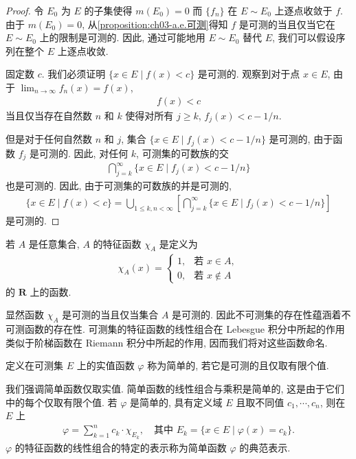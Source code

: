 \documentclass[../../main.tex]{subfiles}
\begin{document}
\begin{proof}
令 $E_{0}$ 为 $E$ 的子集使得 $m(E_{0})=0$ 而 $\{f_{n}\}$ 在 $E\sim E_{0}$ 上逐点收敛于 $f$. 由于 $m(E_{0})=0$, 从\cref{proposition:ch03-a.e.可测}得知 $f$ 是可测的当且仅当它在 $E\sim E_{0}$ 上的限制是可测的. 因此, 通过可能地用 $E\sim E_{0}$ 替代 $E$, 我们可以假设序列在整个 $E$ 上逐点收敛.

固定数 $c$. 我们必须证明 $\{x\in E\mid f(x)<c\}$ 是可测的. 观察到对于点 $x\in E$, 由于 $\lim_{n\to\infty}f_{n}(x)=f(x)$,
\begin{align*}
f(x)<c
\end{align*}
当且仅当存在自然数 $n$ 和 $k$ 使得对所有 $j\geqslant k$, $f_{j}(x)<c-1/n$.

但是对于任何自然数 $n$ 和 $j$, 集合 $\{x\in E\mid f_{j}(x)<c-1/n\}$ 是可测的, 由于函数 $f_{j}$ 是可测的. 因此, 对任何 $k$, 可测集的可数族的交
\begin{align*}
\bigcap_{j=k}^{\infty}\{x\in E\mid f_{j}(x)<c-1/n\}
\end{align*}
也是可测的. 因此, 由于可测集的可数族的并是可测的,
\begin{align*}
\{x\in E\mid f(x)<c\}=\bigcup_{1\leqslant k,n<\infty}\left[\bigcap_{j=k}^{\infty}\{x\in E\mid f_{j}(x)<c-1/n\}\right]
\end{align*}
是可测的.
\end{proof}

若 $A$ 是任意集合, $A$ 的特征函数 $\chi_{A}$ 是定义为
\begin{align*}
\chi_{A}(x)=
\begin{cases}
1,&\text{若 }x\in A,\\
0,&\text{若 }x\notin A
\end{cases}
\end{align*}
的 $\mathbf{R}$ 上的函数.

显然函数 $\chi_{A}$ 是可测的当且仅当集合 $A$ 是可测的. 因此不可测集的存在性蕴涵着不可测函数的存在性. 可测集的特征函数的线性组合在 Lebesgue 积分中所起的作用类似于阶梯函数在 Riemann 积分中所起的作用, 因而我们将对这些函数命名.

\begin{definition}[简单函数]\label{definition:ch03-简单函数}
定义在可测集 $E$ 上的实值函数 $\varphi$ 称为简单的, 若它是可测的且仅取有限个值.
\end{definition}

我们强调简单函数仅取实值. 简单函数的线性组合与乘积是简单的, 这是由于它们中的每个仅取有限个值. 若 $\varphi$ 是简单的, 具有定义域 $E$ 且取不同值 $c_{1},\cdots,c_{n}$, 则在 $E$ 上
\begin{align*}
\varphi=\sum_{k=1}^{n}c_{k}\cdot\chi_{E_{k}},\quad\text{其中 }E_{k}=\{x\in E\mid\varphi(x)=c_{k}\}.
\end{align*}
$\varphi$ 的特征函数的线性组合的特定的表示称为简单函数 $\varphi$ 的典范表示.
\end{document}
